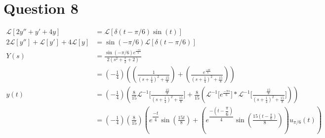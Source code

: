 \documentclass[
	12pt,
	]{article}
\newcommand{\La}{\mathcal{L}}
\theoremstyle{definition}
\theoremstyle{definition}
\theoremstyle{definition}
\theoremstyle{definition}
\theoremstyle{definition}
\theoremstyle{example}
\theoremstyle{note}
\theoremstyle{remark}
\theoremstyle{example}
\begin{document}
		\section*{Question 8}
			\begin{align*}
				\La[2y'' + y' +4y] &= \La[\delta(t-\pi/6)\sin (t)]\\
				2\La[y'']+\La[y']+4\La[y] &= \sin(-\pi/6) \La[\delta(t-\pi/6)] \\
				Y(s) &= \frac{\sin(-\pi/6)e^{\frac{-\pi s}{6}}}{2\left(s^{2}+\frac{s}{2} + 2\right)} \\
				&=\left(-\frac14\right) \left( \left(\frac{1}{\left(s+\frac14\right)^{2} + \frac{15}{8}}\right) + \left(\frac{e^{\frac{-s\pi}{6}}}{\left(s+\frac14\right)^{2} + \frac{15}{8}}\right)\right)\\
				y(t) &= \left(-\frac{1}{4}\right) \left( \frac{8}{15}\La^{-1}\bigg[\frac{\frac{15}{8}}{\left(s+\frac14\right)^{2} + \frac{15}{8}}\bigg] + \frac{8}{15} \left( \La^{-1}\bigg[e^{\frac{-\pi s}{6}}\bigg] \ast \La^{-1}\bigg[\frac{\frac{15}{8}}{\left(s+\frac14\right)^{2} + \frac{15}{8}}\bigg] \right)\right)\\
				&= \left(-\frac14\right)\left(\frac{8}{15}\right) \left( e^{\dfrac{-t}{4}}\sin(\frac{15t}{8})+ \left( e^{\dfrac{-\left(t-\dfrac{\pi}{6}\right)}{4}}\sin(\frac{15(t-\frac{\pi}{6})}{8})\right)u_{\pi/6}(t)\right)
			\end{align*}
				
			
	
\end{document}
